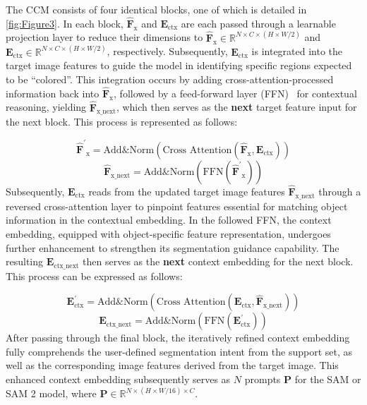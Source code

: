 The CCM consists of four identical blocks, one of which is detailed in \cref{fig:Figure3}. In each block, \(\mathbf{\hat{F}}_{\text{x}}\) and \(\mathbf{E}_{\text{ctx}}\) are each passed through a learnable projection layer to reduce their dimensions to \(\mathbf{\hat{F}}_{\text{x}} \in \mathbb{R}^{N \times C \times (H \times W / 2)}\) and \(\mathbf{E}_{\text{ctx}} \in \mathbb{R}^{N \times C \times (H \times W / 2)}\), respectively. Subsequently, \(\mathbf{E}_{\text{ctx}}\) is integrated into the target image features to guide the model in identifying specific regions expected to be ``colored''. This integration occurs by adding cross-attention-processed information back into \(\mathbf{\hat{F}}_{\text{x}}\), followed by a feed-forward layer (FFN)~\cite{vaswani2017attention} for contextual reasoning, yielding \(\mathbf{\hat{F}}_{\text{x\_next}}\), which then serves as the \textbf{next} target feature input for the next block. This process is represented as follows:

\begin{equation}
\mathbf{\hat{F}^{'}}_{\text{x}} = \text{Add\&Norm}(\text{Cross Attention}(\mathbf{\hat{F}}_{\text{x}}, \mathbf{E}_{\text{ctx}}))
\end{equation}
\begin{equation}
\mathbf{\hat{F}}_{\text{x\_next}} = \text{Add\&Norm}(\text{FFN}(\mathbf{\hat{F}^{'}}_{\text{x}}))
\end{equation}
Subsequently, \(\mathbf{E}_{\text{ctx}}\) reads from the updated target image features \(\mathbf{\hat{F}}_{\text{x\_next}}\) through a reversed cross-attention layer to pinpoint features essential for matching object information in the contextual embedding. In the followed FFN, the context embedding, equipped with object-specific feature representation, undergoes further enhancement to strengthen its segmentation guidance capability. The resulting \(\mathbf{E}_{\text{ctx\_next}}\) then serves as the \textbf{next} context embedding for the next block. This process can be expressed as follows:

\begin{equation}
\mathbf{E}^{'}_{\text{ctx}} = \text{Add\&Norm}(\text{Cross Attention}(\mathbf{E}_{\text{ctx}}, \mathbf{\hat{F}}_{\text{x\_next}}))
\end{equation}
\begin{equation}
\mathbf{E}_{\text{ctx\_next}} = \text{Add\&Norm}(\text{FFN}(\mathbf{E}^{'}_{\text{ctx}}))
\end{equation}
After passing through the final block, the iteratively refined context embedding fully comprehends the user-defined segmentation intent from the support set, as well as the corresponding image features derived from the target image. This enhanced context embedding subsequently serves as \(N\) prompts \(\mathbf{P}\) for the SAM or SAM 2 model, where \(\mathbf{P} \in \mathbb{R}^{N \times (H \times W / 16) \times C}\).

